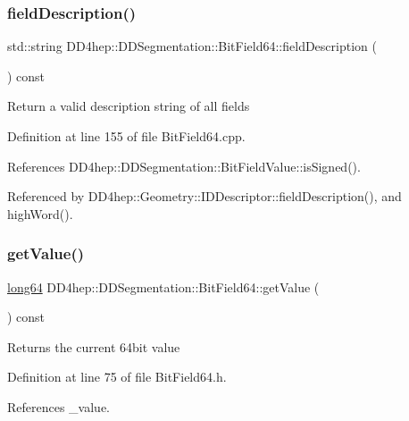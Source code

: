 \subsubsection{\texorpdfstring{field\+Description()}{fieldDescription()}}
{\footnotesize\ttfamily std\+::string D\+D4hep\+::\+D\+D\+Segmentation\+::\+Bit\+Field64\+::field\+Description (\begin{DoxyParamCaption}{ }\end{DoxyParamCaption}) const}

Return a valid description string of all fields 

Definition at line 155 of file Bit\+Field64.\+cpp.



References D\+D4hep\+::\+D\+D\+Segmentation\+::\+Bit\+Field\+Value\+::is\+Signed().



Referenced by D\+D4hep\+::\+Geometry\+::\+I\+D\+Descriptor\+::field\+Description(), and high\+Word().

\hypertarget{class_d_d4hep_1_1_d_d_segmentation_1_1_bit_field64_aac1f1bf981c29946c1edb726c25a9eb6}{}\label{class_d_d4hep_1_1_d_d_segmentation_1_1_bit_field64_aac1f1bf981c29946c1edb726c25a9eb6} 
\subsubsection{\texorpdfstring{get\+Value()}{getValue()}}
{\footnotesize\ttfamily \hyperlink{namespace_d_d4hep_ac2a70e722b33dc7ddaa20db8954ac836}{long64} D\+D4hep\+::\+D\+D\+Segmentation\+::\+Bit\+Field64\+::get\+Value (\begin{DoxyParamCaption}{ }\end{DoxyParamCaption}) const\hspace{0.3cm}{\ttfamily [inline]}}

Returns the current 64bit value 

Definition at line 75 of file Bit\+Field64.\+h.



References \+\_\+value.



